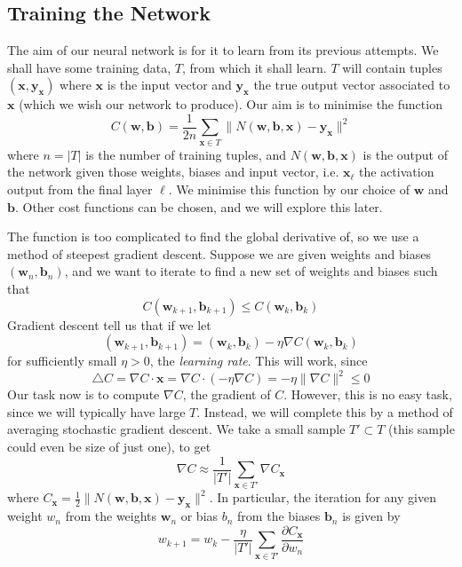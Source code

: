 \documentclass[10pt]{article}
\begin{document}
\subsection{Training the Network}
The aim of our neural network is for it to learn from its previous attempts. We shall have some training data, $T$, from which it shall learn. $T$ will contain tuples $(\mathbf{x},\mathbf{y_x})$ where $\mathbf{x}$ is the input vector and $\mathbf{y_x}$ the true output vector associated to $\mathbf{x}$ (which we wish our network to produce). Our aim is to minimise the function
\[
C(\mathbf{w},\mathbf{b})= \frac{1}{2n} \sum_{\mathbf{x} \in T}\lVert N(\mathbf{w},\mathbf{b},\mathbf{x}) - \mathbf{y_x}\rVert ^2
\]
where $n=|T|$ is the number of training tuples, and $N(\mathbf{w},\mathbf{b},\mathbf{x})$ is the output of the network given those weights, biases and input vector, i.e. $\mathbf{x}_{\ell}$ the activation output from the final layer $\ell$. We minimise this function by our choice of $\mathbf{w}$ and $\mathbf{b}$. Other cost functions can be chosen, and we will explore this later.\par
The function is too complicated to find the global derivative of, so we use a method of steepest gradient descent. Suppose we are given weights and biases $(\mathbf{w}_n, \mathbf{b}_n)$, and we want to iterate to find a new set of weights and biases such that
\[
C(\mathbf{w}_{k+1}, \mathbf{b}_{k+1}) \leq C(\mathbf{w}_k, \mathbf{b}_k)
\]
Gradient descent tell us that if we let
\[
(\mathbf{w}_{k+1}, \mathbf{b}_{k+1}) = (\mathbf{w}_k, \mathbf{b}_k) - \eta \nabla C (\mathbf{w}_{k}, \mathbf{b}_{k})
\]
for sufficiently small $\eta>0$, the \textit{learning rate}. This will work, since
\[
\triangle C = \nabla C \cdot \mathbf{x} = \nabla C \cdot \left( - \eta \nabla C  \right) = - \eta \lVert \nabla C \rVert ^2  \leq 0 
\]
Our task now is to compute $\nabla C$, the gradient of $C$. However, this is no easy task, since we will typically have large $T$. Instead, we will complete this by a method of averaging stochastic gradient descent. We take a small sample $T' \subset T$ (this sample could even be size of just one), to get
\[
\nabla C \approx \frac{1}{|T'|} \sum_{\mathbf{x} \in T'} \nabla C_\mathbf{x}
\]
where $C_\mathbf{x} = \frac{1}{2}\lVert N(\mathbf{w},\mathbf{b},\mathbf{x}) - \mathbf{y_x}\rVert ^2$. In particular, the iteration for any given weight $w_n$ from the weights $\mathbf{w}_n$ or bias $b_n$ from the biases $\mathbf{b}_n$ is given by
\[
w_{k+1} = w_k - \frac{\eta}{|T'|} \sum_{\mathbf{x} \in T'} \frac{\partial C_{\mathbf{x}}}{\partial w_n}
\]
\end{document}
